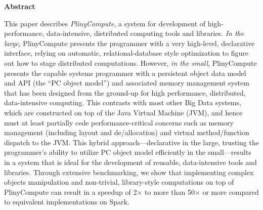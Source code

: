 
\noindent
\textbf{Abstract}

\noindent
This paper describes \emph{PlinyCompute}, a system for development of
high-performance, data-intensive, distributed computing tools and libraries.
\emph{In the large}, PlinyCompute presents the programmer with a very high-level,
declarative interface, relying on automatic, relational-database style optimization to figure out how to stage
distributed computations.  However, \emph{in the small}, PlinyCompute
presents the capable systems programmer with a persistent object data model and API (the ``PC object model'') and associated memory management system
that has been designed from the ground-up for
high performance, distributed, data-intensive computing.
This contrasts with most other Big Data systems, which are constructed on top of the
Java Virtual Machine (JVM), and hence must
at least partially cede performance-critical concerns such as
memory management (including layout and de/allocation) and virtual
method/function dispatch to the JVM.
This hybrid approach---declarative in the large, trusting the programmer's ability
to utilize PC object model efficiently
in the small---results in a system that is ideal for the development of reusable, data-intensive tools and libraries.
Through extensive benchmarking, we show that implementing complex
objects manipulation and non-trivial, library-style computations 
 on top of PlinyCompute can result in a speedup of 2$\times$ to
 more than 50$\times$ or more compared to equivalent implementations on Spark.
